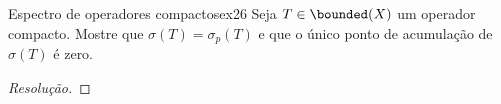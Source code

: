 \begin{exercício}{Espectro de operadores compactos}{ex26}
    Seja \(T \in \bounded(X)\) um operador compacto. Mostre que \(\sigma(T) = \sigma_p(T)\) e que o único ponto de acumulação de \(\sigma(T)\) é zero.
\end{exercício}
\begin{proof}[Resolução]

\end{proof}
